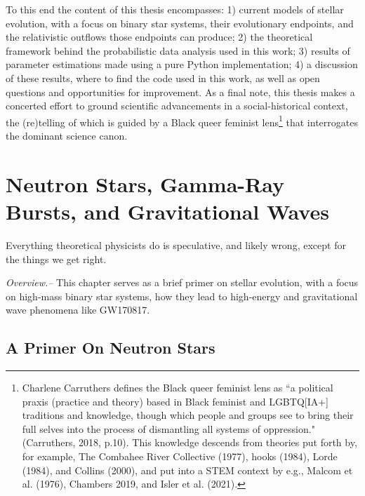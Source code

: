 \documentclass[1.5,11pt]{beavtex}
\begin{document}
To this end the content of this thesis encompasses: 1) current models of stellar evolution, with a focus on binary star systems, their evolutionary endpoints, and the relativistic outflows those endpoints can produce; 2) the theoretical framework behind the probabilistic data analysis used in this work; 3) results of parameter estimations made using a pure Python implementation; 4) a discussion of these results, where to find the code used in this work, as well as open questions and opportunities for improvement. As a final note, this thesis makes a concerted effort to ground scientific advancements in a social-historical context, the (re)telling of which is guided by a Black queer feminist lens\footnote{\selectfont Charlene Carruthers defines the Black queer feminist lens as ``a political praxis (practice and theory) based in Black feminist and LGBTQ[IA+] traditions and knowledge, though which people and groups see to bring their full selves into the process of dismantling all systems of oppression." (Carruthers, 2018, p.10). This knowledge descends from theories put forth by, for example, The Combahee River Collective (1977), hooks (1984), Lorde (1984), and Collins (2000), and put into a STEM context by e.g., Malcom et al. (1976), Chambers 2019, and Isler et al. (2021).} that interrogates the dominant science canon. 

\chapter{Neutron Stars, Gamma-Ray Bursts, and Gravitational Waves} \label{ch:Astro theory}
\begin{fquote} Everything theoretical physicists do is speculative, and likely wrong, except for the things we get right.
 \end{fquote}

\textit{Overview.–} This chapter serves as a brief primer on stellar evolution, with a focus on high-mass binary star systems, how they lead to high-energy and gravitational wave phenomena like GW170817. 


\section{A Primer On Neutron Stars} \label{ch:Astro theory sec:NS}
\end{document}
